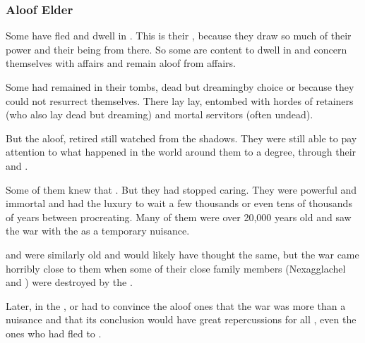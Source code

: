 \subsubsection{Aloof Elder \Dragons}
Some \dragons have fled \Miith and dwell in \Machai. 
This is their , because they draw so much of their power and their being from there.
So some are content to dwell in \Machai and concern themselves with \Machaic affairs and remain aloof from \Miithian affairs. 

Some had remained in their tombs, dead but dreaming\dash by choice or because they could not resurrect themselves. 
There lay lay, entombed with hordes of \ophidian retainers (who also lay dead but dreaming) and mortal servitors (often undead). 

But the aloof, retired \dragons still watched \Miith from the shadows.
They were still able to pay attention to what happened in the world around them to a degree, through their \daemons and \homunculi.



Some of them knew that .
But they had stopped caring. 
They were powerful and immortal and had the luxury to wait a few thousands or even tens of thousands of years between procreating. 
Many of them were over 20,000 years old and saw the war with the \resphain as a temporary nuisance. 

\Ishnaruchaefir and \Secherdamon were similarly old and would likely have thought the same, but the war came horribly close to them when some of their close family members (Nexagglachel and ) were destroyed by the \resphain.

Later, in the \thirdbanewar, \Secherdamon or \Ishnaruchaefir had to convince the aloof ones that the war was more than a nuisance and that its conclusion would have great repercussions for all \dragons, even the ones who had fled to \Machai.

